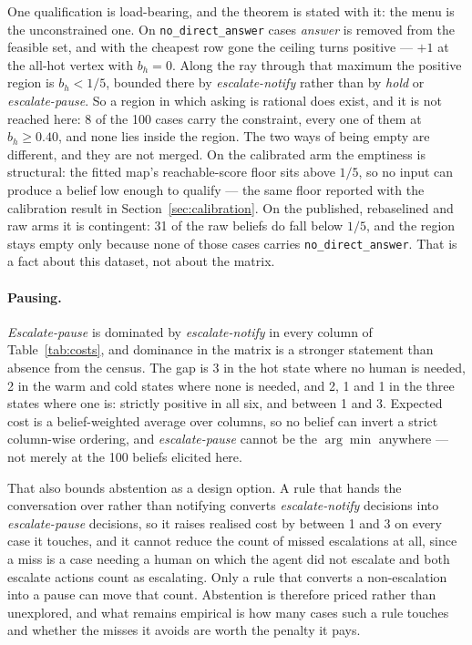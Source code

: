 \documentclass{article}
\begin{document}
One qualification is load-bearing, and the theorem is stated with it: the menu is
the unconstrained one. On \texttt{no\_direct\_answer} cases \emph{answer} is
removed from the feasible set, and with the cheapest row gone the ceiling turns
positive --- $+1$ at the all-hot vertex with $b_h = 0$. Along the ray through that
maximum the positive region is $b_h < 1/5$, bounded there by
\emph{escalate-notify} rather than by \emph{hold} or \emph{escalate-pause}. So a
region in which asking is rational does exist, and it is not reached here: 8 of the
100 cases carry the constraint, every one of them at $b_h \ge 0.40$, and none lies
inside the region. The two ways of being empty are different, and they are not
merged. On the calibrated arm the emptiness is structural: the fitted map's
reachable-score floor sits above $1/5$, so no input can produce a belief low
enough to qualify --- the same floor reported with the calibration
result in Section~\ref{sec:calibration}. On the published, rebaselined and raw arms
it is contingent: 31 of
the raw beliefs do fall below $1/5$, and the region stays empty only because none
of those cases carries \texttt{no\_direct\_answer}. That is a fact about this
dataset, not about the matrix.

\paragraph{Pausing.} \emph{Escalate-pause} is dominated by \emph{escalate-notify}
in every column of Table~\ref{tab:costs}, and dominance in the matrix is a
stronger statement than absence from the census. The gap is 3 in the hot state
where no human is needed, 2 in the warm and cold states where none is needed, and
2, 1 and 1 in the three states where one is: strictly positive in all six, and
between 1 and 3. Expected cost is a belief-weighted average over columns, so no
belief can invert a strict column-wise ordering, and \emph{escalate-pause} cannot
be the $\arg\min$ anywhere --- not merely at the 100 beliefs elicited here.

That also bounds abstention as a design option. A rule that hands the conversation
over rather than notifying converts \emph{escalate-notify} decisions into
\emph{escalate-pause} decisions, so it raises realised cost by between 1 and 3 on
every case it touches, and it cannot reduce the count of missed escalations at all,
since a miss is a case needing a human on which the agent did not escalate and both
escalate actions count as escalating. Only a rule that converts a non-escalation
into a pause can move that count. Abstention is therefore priced rather than
unexplored, and what remains empirical is how many cases such a rule touches and
whether the misses it avoids are worth the penalty it pays.
\end{document}

